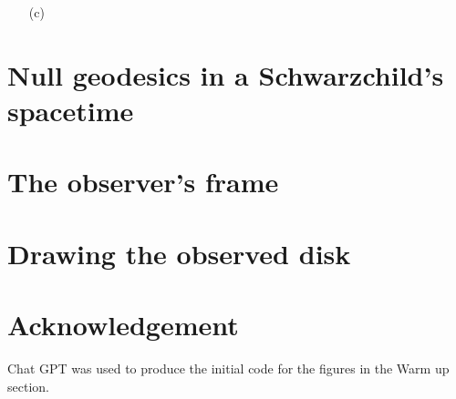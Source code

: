 \documentclass[10pt, a4paper]{article}
\begin{document}
{\begin{enumerate}
\begin{figure}[h!]
  \end{figure}
  \item[(c)] 
\end{enumerate}

\section{Null geodesics in a Schwarzchild's spacetime}

\section{The observer's frame}

\section{Drawing the observed disk}

\section{Acknowledgement}

Chat GPT was used to produce the initial code for the figures in the Warm up section.

}

\makereferences


\end{document}
